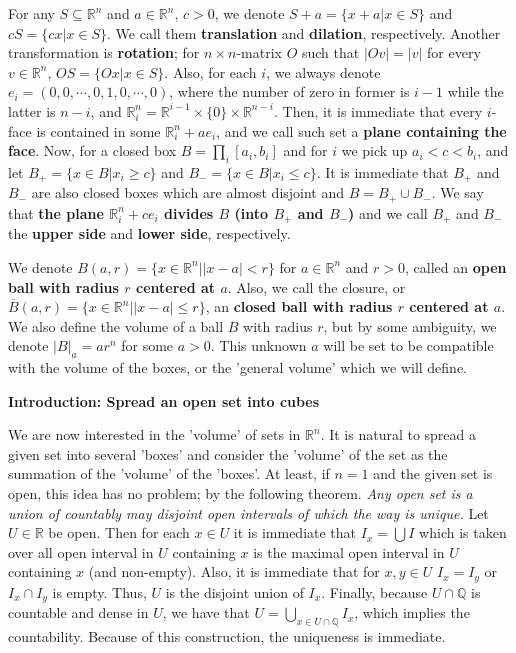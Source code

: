 \documentclass{article}
\newcommand{\RaQ}{\mathbb{Q}}
\newcommand{\ReR}{\mathbb{R}}
\begin{document}
For any $S \subseteq \ReR^n$ and $a \in \ReR^n$, $c > 0$, we denote $S + a = \{x + a | x \in S\}$ and $cS = \{cx | x \in S\}$.
We call them \textbf{translation} and \textbf{dilation}, respectively.
Another transformation is \textbf{rotation}; for $n \times n$-matrix $O$ such that $|Ov| = |v|$ for every $v \in \ReR^n$, $OS = \{Ox | x \in S\}$.
Also, for each $i$, we always denote $e_i = (0, 0, \cdots, 0, 1, 0, \cdots, 0)$, where the number of zero in former is $i - 1$ while the latter is $n - i$, and $\ReR^n_i = \ReR^{i - 1} \times \{0\} \times \ReR^{n - i}$.
Then, it is immediate that every $i$-face is contained in some $\ReR^n_i + a e_i$, and we call such set a \textbf{plane containing the face}.
Now, for a closed box $B = \prod_i [a_i, b_i]$ and for $i$ we pick up $a_i < c < b_i$, and let $B_+ = \{ x \in B | x_i \ge c \}$ and $B_- = \{ x \in B | x_i \le c \}$.
It is immediate that $B_+$ and $B_-$ are also closed boxes which are almost disjoint and $B = B_+ \cup B_-$.
We say that \textbf{the plane $\ReR^n_i + ce_i$ divides $B$ (into $B_+$ and $B_-$)} and we call $B_+$ and $B_-$ the \textbf{upper side} and \textbf{lower side}, respectively.

We denote $B(a, r) = \{x \in \ReR^n | |x - a| < r\}$ for $a \in \ReR^n$ and $r > 0$, called an \textbf{open ball with radius $r$ centered at $a$}.
Also, we call the closure, or $\overline{B}(a, r) = \{x \in \ReR^n | |x - a| \le r\}$, an \textbf{closed ball with radius $r$ centered at $a$}.
We also define the volume of a ball $B$ with radius $r$, but by some ambiguity, we denote $|B|_a = ar^n$ for some $a > 0$.
This unknown $a$ will be set to be compatible with the volume of the boxes, or the 'general volume' which we will define.

\newpage

\textbf{Introduction: Spread an open set into cubes}

We are now interested in the 'volume' of sets in $\ReR^n$.
It is natural to spread a given set into several 'boxes' and consider the 'volume' of the set as the summation of the 'volume' of the 'boxes'.
At least, if $n = 1$ and the given set is open, this idea has no problem; by the following theorem.
\textit{Any open set is a union of countably may disjoint open intervals of which the way is unique.}
Let $U \in \ReR$ be open.
Then for each $x \in U$ it is immediate that $I_x = \bigcup I$ which is taken over all open interval in $U$ containing $x$ is the maximal open interval in $U$ containing $x$ (and non-empty).
Also, it is immediate that for $x, y \in U$ $I_x = I_y$ or $I_x \cap I_y$ is empty.
Thus, $U$ is the disjoint union of $I_x$.
Finally, because $U \cap \RaQ$ is countable and dense in $U$, we have that $U = \bigcup_{x \in U \cap \RaQ} I_x$, which implies the countability.
Because of this construction, the uniqueness is immediate.
\end{document}
